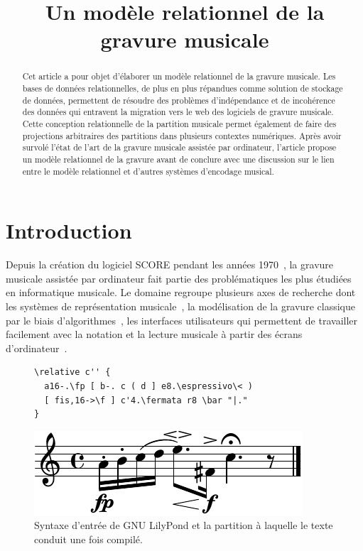 \documentclass{article}
\title{Un modèle relationnel de la gravure musicale}
\begin{document}
%
\capstartfalse
\maketitle
\capstarttrue
%
\begin{abstract}
Cet article a pour objet d'élaborer un modèle relationnel de la gravure
musicale. Les bases de données relationnelles, de plus en plus répandues
comme solution de stockage de données,
permettent de résoudre des problèmes d'indépendance et
de incohérence des données qui entravent la migration vers le web des
logiciels de gravure musicale. Cette conception relationnelle de la partition
musicale permet également de faire des projections arbitraires des partitions
dans plusieurs contextes numériques. Après avoir survolé l'état de l'art de
la gravure musicale assistée par ordinateur, l'article propose un modèle relationnel de la
gravure avant de conclure avec une discussion sur le lien entre le modèle
relationnel et d'autres systèmes d'encodage musical.
\end{abstract}
\section{Introduction}
Depuis la création du logiciel SCORE pendant les années
1970~\cite{smith1972score}, la gravure musicale assistée par ordinateur fait
partie des problématiques les plus étudiées en informatique musicale.
Le domaine regroupe plusieurs axes de recherche dont les systèmes de
représentation musicale~\cite{good2003using}\-\cite{hoos1998guido}\-\cite{good2001musicxml},
la modélisation de la gravure classique par le biais
d'algorithmes~\cite{hegazy1988optimal}\-\cite{blostein1991justification},
les interfaces utilisateurs qui permettent de travailler facilement avec
la notation et la lecture musicale à partir des écrans d'ordinateur~\cite{fitzpatrick1998networked}\-\cite{qian2002portable}\-\cite{egyud1998hand}.
\begin{figure}[h]
\begin{Verbatim}[frame=single,fontsize=\relsize{-1}]
\relative c'' {
  a16-.\fp [ b-. c ( d ] e8.\espressivo\< )
  [ fis,16->\f ] c'4.\fermata r8 \bar "|."
}
\end{Verbatim}
\begin{center}
\includegraphics{example_preview.pdf}
\end{center}
\caption{Syntaxe d'entrée de GNU LilyPond et la partition à laquelle le
texte conduit une fois compilé.}
\end{figure}
\end{document}
